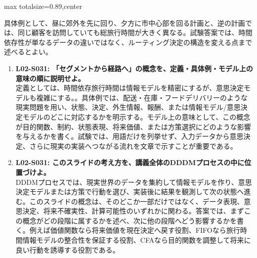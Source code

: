 \begin{minipage}[t]{0.58\textwidth}
\begin{adjustbox}{max totalsize={\textwidth}{0.89\textheight},center}
\begin{minipage}{\textwidth}
具体例として、昼に郊外を先に回り、夕方に市中心部を回る計画と、逆の計画では、同じ顧客を訪問していても総旅行時間が大きく異なる。試験答案では、時間依存性が単なるデータの違いではなく、ルーティング決定の構造を変える点まで述べるとよい。\par{}\begin{enumerate}\item \textbf{L02-S031: 「セグメントから経路へ」の概念を、定義・具体例・モデル上の意味の順に説明せよ。}\\定義としては、時間依存旅行時間は情報モデルを精密にするが、意思決定モデルも複雑にする。。具体例では、配送・在庫・フードデリバリーのような現実問題を用い、状態、決定、外生情報、報酬、または情報モデル/意思決定モデルのどこに対応するかを明示する。モデル上の意味として、この概念が目的関数、制約、状態表現、将来価値、または方策選択にどのような影響を与えるかを書く。試験では、用語だけを列挙せず、入力データから意思決定、さらに現実の実装へつながる流れを文章で示すことが重要である。\item \textbf{L02-S031: このスライドの考え方を、講義全体のDDDMプロセスの中に位置づけよ。}\\DDDMプロセスでは、現実世界のデータを集約して情報モデルを作り、意思決定モデルまたは方策で行動を選び、実装後に結果を観測して次の状態へ進む。このスライドの概念は、そのどこか一部だけではなく、データ表現、意思決定、将来不確実性、計算可能性のいずれかに関わる。答案では、まずこの概念がどの段階に属するかを述べ、次に他の段階へどう影響するかを書く。例えば価値関数なら将来価値を現在決定へ戻す役割、FIFOなら旅行時間情報モデルの整合性を保証する役割、CFAなら目的関数を調整して将来に良い行動を誘導する役割である。\end{enumerate}
\end{minipage}
\end{adjustbox}
\end{minipage}


